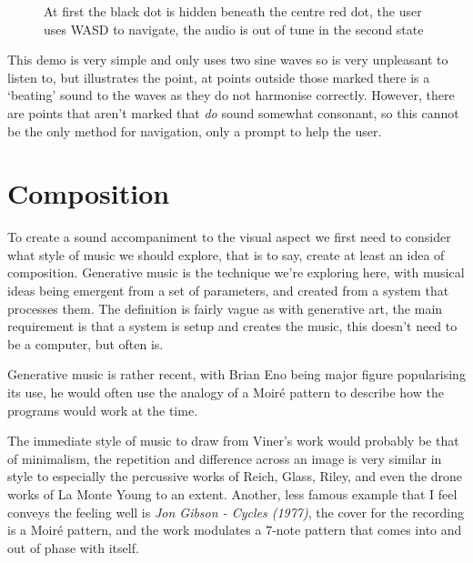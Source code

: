 \begin{figure}[H]
\centering
{}%
\hspace*{2cm}%
\caption{At first the black dot is hidden beneath the centre red dot, the user uses WASD to navigate,
the audio is out of tune in the second state}
\end{figure}

This demo is very simple and only uses two sine waves so is very unpleasant to
listen to, but illustrates the point, at points outside those marked there is a
`beating' sound to the waves as they do not harmonise correctly. However, there
are points that aren't marked that \emph{do} sound somewhat consonant, so this
cannot be the only method for navigation, only a prompt to help the user.
\section{Composition}
To create a sound accompaniment to the visual aspect we first need to consider
what style of music we should explore, that is to say, create at least an idea
of composition. Generative music is the technique we're exploring here, with
musical ideas being emergent from a set of parameters, and created from a system
that processes them. The definition is fairly vague as with generative art, the
main requirement is that a system is setup and creates the music, this doesn't
need to be a computer, but often is.

Generative music is rather recent, with Brian Eno being major figure
popularising its use, he would often use the analogy of a Moir\'{e} pattern to
describe how the programs would work at the time.  

The immediate style of music to draw from Viner's work would probably be that of
minimalism, the repetition and difference across an image is very similar in
style to especially the percussive works of Reich, Glass, Riley, and even the
drone works of La Monte Young to an extent. Another, less famous example that I
feel conveys the feeling well is \emph{Jon Gibson - Cycles (1977)}, the cover
for the recording is a Moir\'{e} pattern, and the work modulates a 7-note
pattern that comes into and out of phase with itself. 

